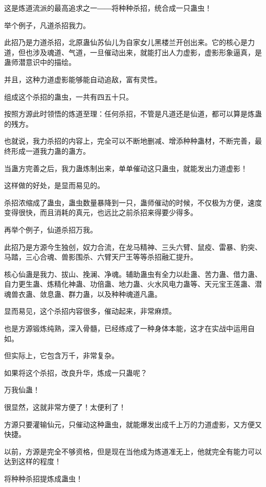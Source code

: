 
\begin{this_body}

这是炼道流派的最高追求之一――将种种杀招，统合成一只蛊虫！

举个例子，凡道杀招我力。

此招乃是力道杀招，北原蛊仙苏仙儿为自家女儿黑楼兰开创出来。它的核心是力道，但也涉及魂道、气道，一旦催动出来，就能打出人力虚影，虚影形象逼真，是蛊师潜意识中的描绘。

并且，这种力道虚影能够能自动追敌，富有灵性。

组成这个杀招的蛊虫，一共有四五十只。

按照方源此时领悟的炼道至理：任何杀招，不管是凡道还是仙道，都可以算是炼蛊的残方。

也就说，我力杀招的内容上，完全可以不断地删减、增添种种蛊材，不断完善，最终形成一道我力蛊的蛊方。

当蛊方完善之后，我力蛊炼制出来，单单催动这只蛊虫，就能发出力道虚影！

这样做的好处，是显而易见的。

杀招浓缩成了蛊虫，蛊虫数量暴降到一只，蛊师催动的时候，不仅极为方便，速度变得很快，而且消耗的真元，也远比之前杀招来得要少得多。

再举个例子，仙道杀招万我。

此招乃是方源今生独创，奴力合流，在龙马精神、三头六臂、鼠疫、雷暴、豹突、马踏，三心合魂、兽影围杀、六臂天尸王等等杀招融汇提升。

核心仙蛊是我力、拔山、挽澜、净魂。辅助蛊虫有全力以赴蛊、苦力蛊、借力蛊、自力更生蛊、炼精化神蛊、功倍蛊、地力蛊、火水风电力蛊等、天元宝王莲蛊、潜魂兽衣蛊、敛息蛊、群力蛊，以及种种魂道凡蛊。

显而易见，这个杀招内容很多，催动起来，非常麻烦。

也是方源锻炼纯熟，深入骨髓，已经练成了一种身体本能，这才在实战中运用自如。

但实际上，它包含万千，非常复杂。

如果将这个杀招，改良升华，炼成一只蛊呢？

万我仙蛊！

很显然，这就非常方便了！太便利了！

方源只要灌输仙元，只催动这种蛊虫，就能爆发出成千上万的力道虚影，又方便又快捷。

以前，方源是完全不够资格，但是现在当他成为炼道准无上，他就完全有能力可以达到这样的程度！

将种种杀招提炼成蛊虫！


\end{this_body}
